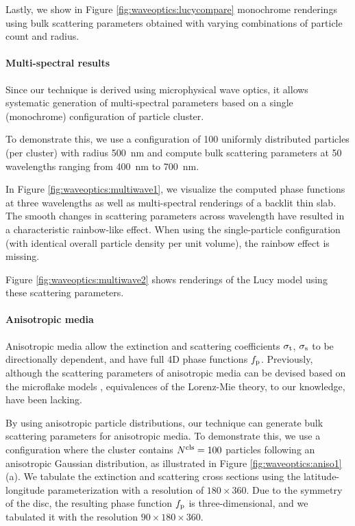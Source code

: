 Lastly, we show in Figure \ref{fig:waveoptics:lucycompare} monochrome renderings using bulk scattering parameters obtained with varying combinations of particle count and radius.


\paragraph{Multi-spectral results}

Since our technique is derived using microphysical wave optics, it allows systematic generation of multi-spectral parameters based on a single (monochrome) configuration of particle cluster.

To demonstrate this, we use a configuration of 100 uniformly distributed particles (per cluster) with radius 500~nm and compute bulk scattering parameters at 50 wavelengths ranging from 400~nm to 700~nm.





In Figure \ref{fig:waveoptics:multiwave1}, we visualize the computed phase functions at three wavelengths as well as multi-spectral renderings of a backlit thin slab.
The smooth changes in scattering parameters across wavelength have resulted in a characteristic rainbow-like effect.
When using the single-particle configuration (with identical overall particle density per unit volume), the rainbow effect is missing.

Figure \ref{fig:waveoptics:multiwave2} shows renderings of the Lucy model using these scattering parameters.


\paragraph{Anisotropic media}

Anisotropic media allow the extinction and scattering coefficients $\sigma_\mathrm{t}$, $\sigma_\mathrm{s}$ to be directionally dependent, and have full 4D phase functions $f_\mathrm{p}$.
Previously, although the scattering parameters of anisotropic media can be devised based on the microflake models \cite{jakob2010radiative,heitz2015sggx}, equivalences of the Lorenz-Mie theory, to our knowledge, have been lacking. 



By using anisotropic particle distributions, our technique can generate bulk scattering parameters for anisotropic media.
To demonstrate this, we use a configuration where the cluster contains $N^\mathrm{cls} = 100$ particles following an anisotropic Gaussian distribution, as illustrated in Figure \ref{fig:waveoptics:aniso1}(a).
We tabulate the extinction and scattering cross sections using the latitude-longitude parameterization with a resolution of $180 \times 360$.
Due to the symmetry of the disc, the resulting phase function $f_\mathrm{p}$ is three-dimensional, and we tabulated it with the resolution $90 \times 180 \times360$.

